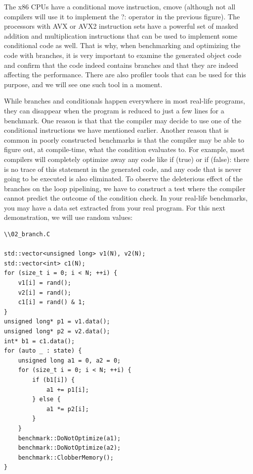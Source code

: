 The x86 CPUs have a conditional move instruction, cmove (although not all compilers will use it to implement the ?: operator in the previous figure). The processors with AVX or AVX2 instruction sets have a powerful set of masked addition and multiplication instructions that can be used to implement some conditional code as well. That is why, when benchmarking and optimizing the code with branches, it is very important to examine the generated object code and confirm that the code indeed contains branches and that they are indeed affecting the performance. There are also profiler tools that can be used for this purpose, and we will see one such tool in a moment.

While branches and conditionals happen everywhere in most real-life programs, they can disappear when the program is reduced to just a few lines for a benchmark. One reason is that that the compiler may decide to use one of the conditional instructions we have mentioned earlier. Another reason that is common in poorly constructed benchmarks is that the compiler may be able to figure out, at compile-time, what the condition evaluates to. For example, most compilers will completely optimize away any code like if (true) or if (false): there is no trace of this statement in the generated code, and any code that is never going to be executed is also eliminated. To observe the deleterious effect of the branches on the loop pipelining, we have to construct a test where the compiler cannot predict the outcome of the condition check. In your real-life benchmarks, you may have a data set extracted from your real program. For this next demonstration, we will use random values:

\begin{lstlisting}[style=styleCXX]
\\02_branch.C

std::vector<unsigned long> v1(N), v2(N);
std::vector<int> c1(N);
for (size_t i = 0; i < N; ++i) {
	v1[i] = rand();
	v2[i] = rand();
	c1[i] = rand() & 1;
}
unsigned long* p1 = v1.data();
unsigned long* p2 = v2.data();
int* b1 = c1.data();
for (auto _ : state) {
	unsigned long a1 = 0, a2 = 0;
	for (size_t i = 0; i < N; ++i) {
		if (b1[i]) {
			a1 += p1[i];
		} else {
			a1 *= p2[i];
		}
	}
	benchmark::DoNotOptimize(a1);
	benchmark::DoNotOptimize(a2);
	benchmark::ClobberMemory();
}
\end{lstlisting}

